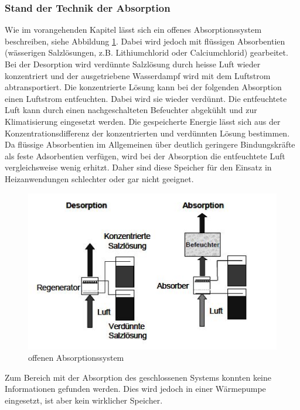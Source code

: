 \documentclass[11pt,a4paper]{scrartcl}
\begin{document}
\subsubsection{Stand der Technik der Absorption}

Wie im vorangehenden Kapitel lässt sich ein offenes Absorptionssystem
beschreiben, siehe Abbildung \ref{fig:offenessystemabsorption}. Dabei wird
jedoch mit flüssigen Absorbentien (wässerigen Salzlösungen, z.B. Lithiumchlorid
oder Calciumchlorid) gearbeitet.
Bei der Desorption wird verdünnte Salzlösung durch heisse Luft wieder
konzentriert und der ausgetriebene Wasserdampf wird mit dem Luftstrom
abtransportiert. Die konzentrierte Lösung kann bei der folgenden Absorption
einen Luftstrom entfeuchten. Dabei wird sie wieder verdünnt. Die entfeuchtete
Luft kann durch einen nachgeschalteten Befeuchter abgekühlt und zur
Klimatisierung eingesetzt werden. Die gespeicherte Energie lässt sich aus der
Konzentrationsdifferenz der konzentrierten und verdünnten Lösung bestimmen. Da
flüssige Absorbentien im Allgemeinen über deutlich geringere Bindungskräfte als
feste Adsorbentien verfügen, wird bei der Absorption die entfeuchtete Luft
vergleichsweise wenig erhitzt. Daher sind diese Speicher für den Einsatz in
Heizanwendungen schlechter oder gar nicht geeignet.

\begin{figure}[h!]
\begin{center}
\includegraphics[scale=1]{images/offenessystemabsorption.jpg}
\caption{offenen Absorptionssystem \cite{Ferdinandschmidt}}
\label{fig:offenessystemabsorption}
\end{center}
\end{figure}


Zum Bereich mit der Absorption des geschlossenen Systems konnten keine
Informationen gefunden werden. Dies wird jedoch in einer Wärmepumpe eingesetzt,
ist aber kein wirklicher Speicher.
\end{document}
